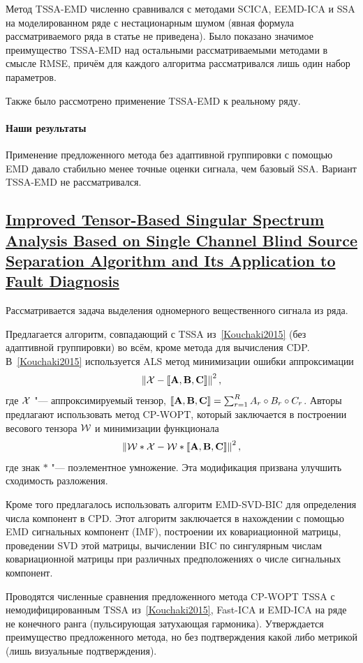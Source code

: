 \documentclass[12pt]{article}
\theoremstyle{plain}
\theoremstyle{definition}
\theoremstyle{remark}
\begin{document}
Метод TSSA-EMD численно сравнивался с методами SCICA,
EEMD-ICA и SSA на моделированном ряде с нестационарным шумом (явная
формула рассматриваемого ряда в статье не приведена).
Было показано значимое преимущество TSSA-EMD над остальными
рассматриваемыми методами в смысле RMSE, причём для каждого алгоритма
рассматривался лишь один набор параметров.

Также было рассмотрено применение TSSA-EMD к реальному ряду.

\paragraph{Наши результаты}
Применение предложенного метода без адаптивной группировки с
помощью EMD давало стабильно менее точные оценки сигнала, чем базовый SSA.
Вариант TSSA-EMD не рассматривался.

\subsection{\href{https://doi.org/10.3390/app7040418}{Improved
    Tensor-Based Singular Spectrum Analysis Based on Single Channel Blind
Source Separation Algorithm and Its App\-lication to Fault Diagnosis}}
\label{Yang2017}
Рассматривается задача выделения одномерного вещественного сигнала из ряда.

Предлагается алгоритм, совпадающий с TSSA из~\ref{Kouchaki2015} (без
адаптивной группировки) во всём, кроме метода для вычисления CDP.
В~\ref{Kouchaki2015} используется ALS метод минимизации ошибки аппроксимации
\[
  \left\|\mathcal{X} - \llbracket \mathbf{A}, \mathbf{B}, \mathbf{C}\rrbracket \right\|^2,
\]
где $\mathcal{X}$ "--- аппроксимируемый тензор,
$\llbracket \mathbf{A}, \mathbf{B}, \mathbf{C}\rrbracket = \sum_{r=1}^{R} A_r \circ B_r
\circ C_r$.
Авторы предлагают использовать метод CP-WOPT, который заключается в построении
весового тензора $\mathcal{W}$ и минимизации функционала
\[
  \left\|\mathcal{W} * \mathcal{X} - \mathcal{W} * \llbracket \mathbf{A}, \mathbf{B},
  \mathbf{C}\rrbracket \right\|^2,
\]
где знак $*$ "--- поэлементное умножение.
Эта модификация призвана улучшить сходимость разложения.

Кроме того предлагалось использовать алгоритм EMD-SVD-BIC для
определения числа компонент в CPD.
Этот алгоритм заключается в нахождении с помощью EMD сигнальных
компонент (IMF), построении их ковариационной матрицы, проведении SVD
этой матрицы, вычислении BIC по сингулярным числам ковариационной
матрицы при различных предположениях о числе сигнальных компонент.

Проводятся численные сравнения предложенного метода CP-WOPT TSSA с
немодифицированным TSSA из~\ref{Kouchaki2015}, Fast-ICA и EMD-ICA на
ряде не конечного ранга (пульсирующая затухающая гармоника).
Утверждается преимущество предложенного метода, но без подтверждения
какой либо метрикой (лишь визуальные подтверждения).
\end{document}
